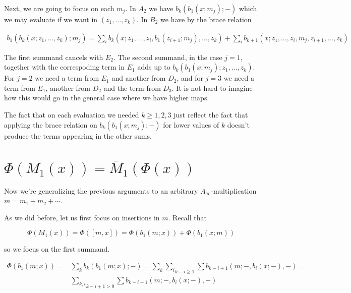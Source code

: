 \documentclass[twoside]{article}
\begin{document}
Next, we are going to focus on each $m_j$. In $A_2$ we have $b_k(b_1(x;m_j);-)$ which we may evaluate if we want in $(z_1,\dots, z_k)$. In $B_2$ we have by the brace relation

\begin{align*}
b_1(b_k(x;z_1,\dots, z_k);m_j)=\sum_ib_k(x;z_1,\dots, z_i, b_1(z_{i+1};m_j),\dots, z_k)+\sum_ib_{k+1}(x;z_1,\dots, z_i,m_j,z_{i+1},\dots, z_k)
\end{align*}

The first summand cancels with $E_2$. The second summand, in the case $j=1$, together with the correspoding term in $E_1$ adds up to $b_k(b_1(x;m_j);z_1,\dots, z_k)$. For $j=2$ we need a term from $E_1$ and another from $D_2$, and for $j=3$ we need a term from $E_1$, another from $D_2$ and the term from $D_3$. It is not hard to imagine how this would go in the general case where we have higher maps. 

\begin{remark}
The fact that on each evaluation we needed $k\geq 1,2,3$ just reflect the fact that applying the brace relation on $b_k(b_1(x;m_j);-)$ for lower values of $k$ doesn't produce the terms appearing in the other sums. 
\end{remark}





\section{$\Phi(M_1(x))=\overline{M}_1(\Phi(x))$}
Now we're generalizing the previous arguments to an arbitrary $A_\infty$-multiplication $m=m_1+m_2+\cdots$.

As we did before, let us first focus on insertions in $m$. Recall that 

$$\Phi(M_1(x))=\Phi([m,x])=\Phi(b_1(m;x))+\Phi(b_1(x;m))$$

so we focus on the first summand. 

\begin{align*}
\Phi(b_1(m;x))=&\sum_k b_k(b_1(m;x);-)=\sum_k \underset{k-i\geq 1}{\sum_i} \sum b_{k-i+1}(m;-, b_i(x;-),-)=\\
&\underset{k-i+1> 0}{\sum_{k,i}}\sum b_{k-i+1}(m;-, b_i(x;-),-)
\end{align*}
\end{document}
